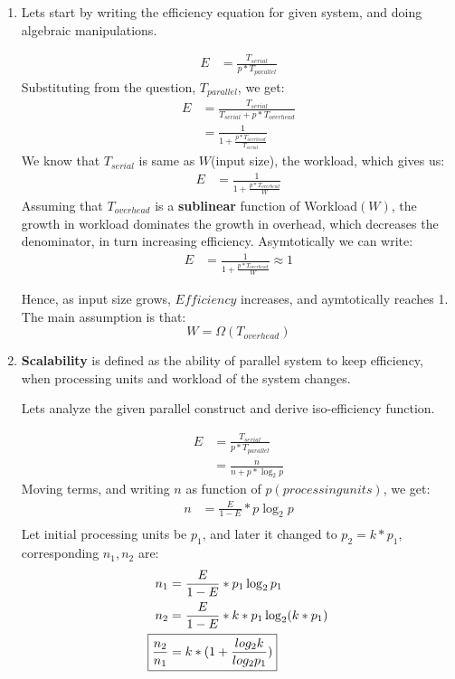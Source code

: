 \documentclass{article}
\newcommand{\bld}[1]{\textbf{#1}}
\begin{document}
\begin{enumerate}[label=(\alph*)]

\item Lets start by writing the efficiency equation for given system, and doing algebraic manipulations.

\begin{align*}
E &=\frac{T_{serial}}{p*T_{parallel}}
\end{align*}
Substituting from the question, $T_{parallel}$, we get:
\begin{align*}
E &=\frac{T_{serial}}{T_{serial}+p*T_{overhead}}\\
  &=\frac{1}{1+\frac{p*T_{overhead}}{T_{serial}}}
\end{align*}
We know that $T_{serial}$ is same as $W$(input size), the workload, which gives us:
\begin{align*}
E &=\frac{1}{1+\frac{p*T_{overhead}}{W}}
\end{align*}
Assuming that $T_{overhead}$ is a \bld{sublinear} function of Workload$(W)$, the growth in workload dominates the growth in overhead, which decreases the denominator, in turn increasing efficiency. Asymtotically we can write:
\begin{align*}
E &=\frac{1}{1+\frac{p*T_{overhead}}{W}} \approx{1}
\end{align*}

Hence, as input size grows, $Efficiency$ increases, and aymtotically reaches 1. The main assumption is that: $$W = \Omega({T_{overhead}})$$

\item \bld{Scalability} is defined as the ability of parallel system to keep efficiency, when processing units and workload of the system changes.

Lets analyze the given parallel construct and derive iso-efficiency function.

\begin{align*}
E &=\frac{T_{serial}}{p*T_{parallel}}\\
  &=\frac{n}{n+p*\log_2 p}
\end{align*}
Moving terms, and writing $n$ as function of $p(processing units)$, we get:  
\begin{align*}
n &=\frac{E}{1-E}*p\log_2 p\\
\end{align*}
Let initial processing units be $p_1$, and later it changed to $p_2=k*p_1$, corresponding $n_1,n_2$ are:
\begin{align*}
n_1 &=\frac{E}{1-E}*p_1\log_2 p_1\\
n_2 &=\frac{E}{1-E}*k*p_1\log_2 (k*p_1)\\
\Aboxed{\frac{n_2}{n_1} &= k*(1+\frac{log_2 k}{log_2 p_1})}
\end{align*}


\end{enumerate}
\end{document}
